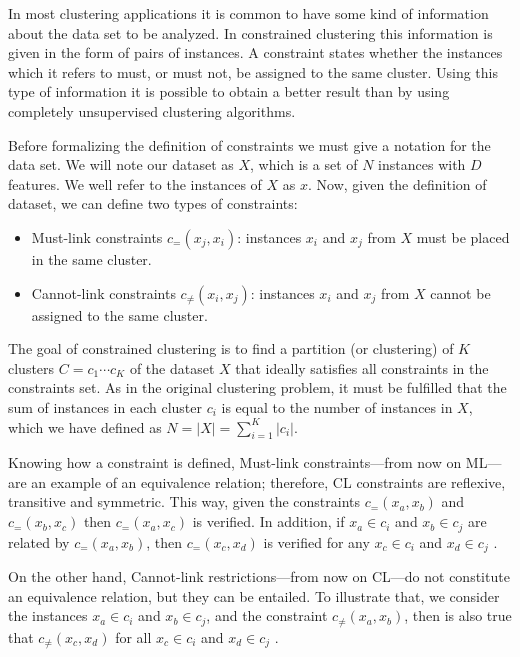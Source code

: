 \documentclass[review]{elsarticle}
\begin{document}
In most clustering applications it is common to have some kind of information about the data set to be analyzed. In constrained clustering this information is given in the form of pairs of instances. A constraint states whether the instances which it refers to must, or must not, be assigned to the same cluster. Using this type of information it is possible to obtain a better result than by using completely unsupervised clustering algorithms. 

Before formalizing the definition of constraints we must give a notation for the data set. We will note our dataset as $X$, which is a set of $N$ instances with $D$ features. We well refer to the instances of $X$ as $x$. Now, given the definition of dataset, we can define two types of constraints:

\begin{itemize}
	
	\item Must-link constraints $c_=(x_j,x_i)$: instances $x_i$ and $x_j$ from $X$ must be placed in the same cluster.
	
	\item Cannot-link constraints $c_{\neq}(x_i,x_j)$: instances $x_i$ and $x_j$ from $X$ cannot be assigned to the same cluster.
	
\end{itemize}

The goal of constrained clustering is to find a partition (or clustering) of $K$ clusters $C = {c_1 \cdots c_K}$ of the dataset $X$ that ideally satisfies all constraints in the constraints set. As in the original clustering problem, it must be fulfilled that the sum of instances in each cluster $c_i$ is equal to the number of instances in $X$, which we have defined as $N = |X| = \sum_{i = 1}^{K} |c_i| $.

Knowing how a constraint is defined, Must-link constraints---from now on ML---are an example of an equivalence relation; therefore, CL constraints are reflexive, transitive and symmetric. This way, given the constraints $c_=(x_a,x_b)$ and $c_=(x_b,x_c)$ then $c_=(x_a,x_c)$ is verified. In addition, if $x_a \in c_i$ and $x_b \in c_j$ are related by $c_=(x_a,x_b)$, then $c_=(x_c,x_d)$ is verified for any $x_c \in c_i$ and $x_d \in c_j$ \cite{xu2013improving}\cite{davidson2007survey}.

On the other hand, Cannot-link restrictions---from now on CL---do not constitute an equivalence relation, but they can be entailed. To illustrate that, we consider the instances $x_a \in c_i$ and $x_b \in c_j$, and the constraint $c_{\neq}(x_a,x_b)$, then is also true that $c_{\neq}(x_c,x_d)$ for all $x_c \in c_i$ and $x_d \in c_j$ \cite{davidson2007survey}. 
\end{document}
